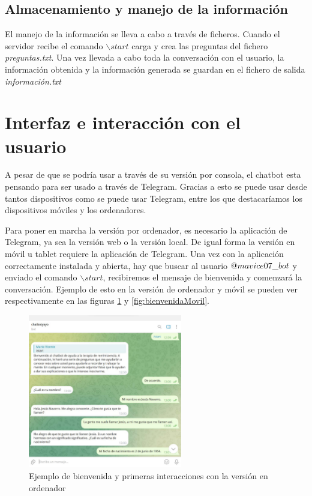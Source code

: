 \subsection{Almacenamiento y manejo de la información}

El manejo de la información se lleva a cabo a través de ficheros. Cuando el servidor recibe el comando $\backslash start$ carga y crea las preguntas del fichero \textit{preguntas.txt}. Una vez llevada a cabo toda la conversación con el usuario, la información obtenida y la información generada se guardan en el fichero de salida \textit{información.txt}

\section{Interfaz e interacción con el usuario}
A pesar de que se podría usar a través de su versión por consola, el chatbot esta pensando para ser usado a través de Telegram. Gracias a esto se puede usar desde tantos dispositivos como se puede usar Telegram, entre los que destacaríamos los dispositivos móviles y los ordenadores.

Para poner en marcha la versión por ordenador, es necesario la aplicación de Telegram, ya sea la versión web o la versión local. De igual forma la versión en móvil u tablet requiere la aplicación de Telegram. Una vez con la aplicación correctamente instalada y abierta, hay que buscar al usuario $\makeatletter @ mavice07\_bot$ y enviado el comando  $\backslash start$, recibiremos el mensaje de bienvenida y comenzará la conversación. Ejemplo de esto en la versión de ordenador y móvil se pueden ver respectivamente en las figuras \ref{fig:bienvenidaOrdenador} y \ref{fig:bienvenidaMovil}.

\begin{figure}[h]
	\centering
	\includegraphics[width=0.6\textwidth]{Imagenes/bienvenidaOrdenador}
	\caption{Ejemplo de bienvenida y primeras interacciones con la versión en ordenador}
	\label{fig:bienvenidaOrdenador}
\end{figure}

